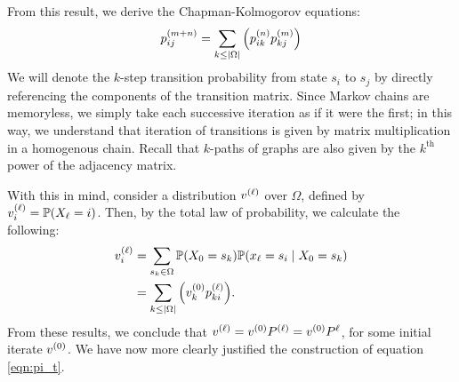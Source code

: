 \documentclass[../exploring-pagerank.tex]{subfiles}
\begin{document}
	From this result, we derive the Chapman-Kolmogorov equations:
	\begin{equation}
	        p^{(m+n)}_{ij} = \sum_{k\leq |\Omega|}{\left( p^{(n)}_{ik} p^{(m)}_{kj} \right)}
	\end{equation}
    We will denote the $k$-step transition probability from state $s_i$ to $s_j$ by directly referencing the components of the transition matrix. Since Markov chains are memoryless, we simply take each successive iteration as if it were the first; in this way, we understand that iteration of transitions is given by matrix multiplication in a homogenous chain. Recall that $k$-paths of graphs are also given by the $k^\text{th}$ power of the adjacency matrix.

    With this in mind, consider a distribution $v^{(\ell)}$ over $\Omega$, defined by $v^{(\ell)}_i = \mathbb{P}(X_\ell = i)$. Then, by the total law of probability, we calculate the following:
    \begin{align*}
        v^{(\ell)}_i &= \sum_{s_k\in\Omega}{\mathbb{P}(X_0 = s_k) \mathbb{P}(x_\ell = s_i \mid X_0 = s_k)} \\
        &= \sum_{k\leq |\Omega|}{\left( v^{(0)}_k p^{(\ell)}_{ki} \right)}.
    \end{align*}
    From these results, we conclude that $v^{(\ell)} = v^{(0)} P^{(\ell)} = v^{(0)} P^\ell$, for some initial iterate $v^{(0)}$. We have now more clearly justified the construction of equation \eqref{eqn:pi_t}.
\end{document}
